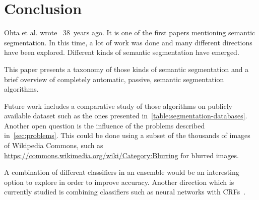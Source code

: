 
\section{Conclusion}%
\label{sec:discussion}
Ohta et al. wrote~\cite{ohta1978analysis} 38~years ago. It is one of the first
papers mentioning semantic segmentation. In this time, a lot of work was done
and many different directions have been explored. Different kinds of semantic
segmentation have emerged.

This paper presents a taxonomy of those kinds of semantic segmentation and a
brief overview of completely automatic, passive, semantic segmentation
algorithms.

Future work includes a comparative study of those algorithms on publicly
available dataset such as the ones presented
in~\cref{table:segmentation-databases}. Another open question is the influence
of the problems described in~\cref{sec:problems}. This could be done using a
subset of the thousands of images of Wikipedia Commons, such as \href{https://commons.wikimedia.org/wiki/Category:Blurring}{https://commons.wikimedia.org/wiki/Category:Blurring} for blurred images.

A combination of different classifiers in an ensemble would be an interesting
option to explore in order to improve accuracy. Another direction which is
currently studied is combining classifiers such as neural networks with
\glspl{CRF}~\cite{zheng2015conditional}.
